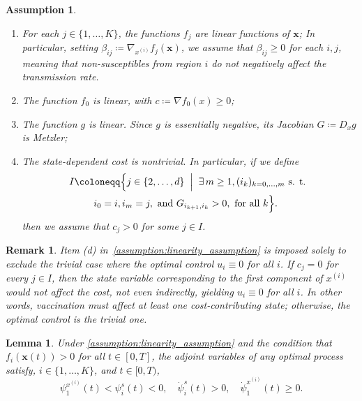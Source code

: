 \documentclass[letterpaper, 10 pt, conference]{ieeeconf}
\newcommand{\fori}[1]{#1 \in \{1,\dots, K\}}
\newtheorem{assumption}{Assumption}
\newtheorem{lemma}{Lemma}
\newtheorem{remark}{Remark}
\begin{document}
\begin{assumption}
    \label{assumption:linearity_assumption}
    \begin{enumerate}
        \item[(a)]  For each $\fori{j}$, the functions $f_j$ are linear functions of $\boldsymbol{x}$;
        In particular, setting  $\beta_{ij} \coloneqq \nabla_{x^{(i)}} f_j(\boldsymbol{x})$, we assume that $\beta_{ij} \ge 0$ for each $i,j$, meaning that non-susceptibles from region $i$ do not negatively affect the transmission rate.
        \item[(b)] The function $f_0$ is linear, with $c \coloneqq \nabla f_0(x) \ge 0$;
        \item[(c)] The function $g$ is linear.
        Since $g$ is essentially negative, its Jacobian $G \coloneqq D_x g$ is Metzler;
        \item[(d)] The state-dependent cost is nontrivial. 
        In particular, if we define
        \[
        \begin{split}
            I &\coloneqq \Bigl\{ j \in \{2,\dots, d\} \;\Bigm|\; \exists\, m \ge1, (i_k)_{k=0,\dots,m} \text{ s. t. } \\ 
            &\quad\quad i_0=i, i_m=j,  \text{ and } G_{i_{k+1},i_k} > 0, \text{ for all } k\Bigr\}.
        \end{split}
        \]
        then we assume that \(c_j > 0\) for some \(j\in I\).
    \end{enumerate}
\end{assumption}

\begin{remark}
    \label{remark:assumption}
    Item  (d) in~\autoref{assumption:linearity_assumption} is imposed solely to exclude the trivial case where the optimal control $u_i\equiv 0$ for all $i$.
    If $c_j = 0$ for every $j \in I$, then the state variable corresponding to the first component of $x^{(i)}$ would not affect the cost, not even indirectly, yielding $u_i \equiv 0$ for all $i$. 
    In other words, vaccination must affect at least one cost-contributing state; otherwise, the optimal control is the trivial one.
\end{remark}

\begin{lemma}
    \label{lemma:shadow_price}
    Under \autoref{assumption:linearity_assumption} and the condition that $f_i(\boldsymbol{x}(t)) > 0$ for all $t \in [0,T]$, the adjoint variables of any optimal process satisfy, $\fori{i}$, and $t \in [0, T)$, 
    \[
    \psi^{x^{(i)}}_1(t) < \psi_i^s(t) <0 ,\quad \dot{\psi}_i^s(t) > 0,\quad \dot{\psi}_1^{x^{(i)}}(t) \ge 0.
    \]
\end{lemma}
\end{document}
